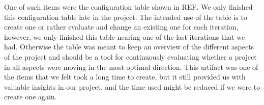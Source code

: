 One of such items were the configuration table shown in REF. We only finished this configuration table late in the project. The intended use of the table is to create one or rather evaluate and change an existing one for each iteration, however, we only finished this table nearing one of the last iterations that we had. Otherwise the table was meant to keep an overview of the different aspects of the project and should be a tool for continuously evaluating whether a project in all aspects were moving in the most optimal direction. This artifact was one of the items that we felt took a long time to create, but it still provided us with valuable insights in our project, and the time used might be reduced if we were to create one again.


